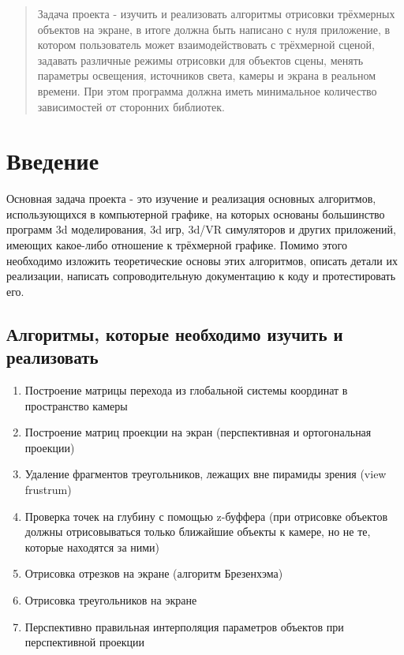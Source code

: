 \documentclass{article}
\begin{document}
\makeTitlePage

\tableofcontents

\begin{abstract}
Задача проекта - изучить и реализовать алгоритмы отрисовки трёхмерных объектов на экране, в итоге должна быть написано с нуля приложение, в котором пользователь может взаимодействовать с трёхмерной сценой, задавать различные режимы отрисовки для объектов сцены, менять параметры освещения, источников света, камеры и экрана в реальном времени. При этом программа должна иметь минимальное количество зависимостей от сторонних библиотек.
\end{abstract}

\pagebreak
\section{Введение}
Основная задача проекта - это изучение и реализация основных алгоритмов, использующихся в компьютерной графике, на которых основаны большинство программ 3d моделирования, 3d игр, 3d/VR симуляторов и других приложений, имеющих какое-либо отношение к трёхмерной графике. Помимо этого необходимо изложить теоретические основы этих алгоритмов, описать детали их реализации, написать сопроводительную документацию к коду и протестировать его.

\subsection{Алгоритмы, которые необходимо изучить и реализовать}
\begin{enumerate}
	\item Построение матрицы перехода из глобальной системы координат в пространство камеры
	\item Построение матриц проекции на экран (перспективная и ортогональная проекции)
	\item Удаление фрагментов треугольников, лежащих вне пирамиды зрения (view frustrum)
	\item Проверка точек на глубину с помощью z-буффера (при отрисовке объектов должны отрисовываться только ближайшие объекты к камере, но не те, которые находятся за ними)
	\item Отрисовка отрезков на экране (алгоритм Брезенхэма)
	\item Отрисовка треугольников на экране
	\item Перспективно правильная интерполяция параметров объектов при перспективной проекции
\end{enumerate}
\end{document}
